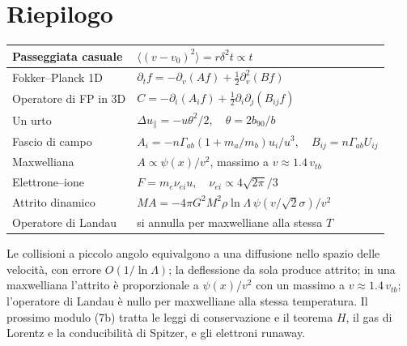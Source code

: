 \section{Riepilogo}
\begin{center}
\small
\begin{tabular}{|l|l|}
\hline
Passeggiata casuale & $\langle(v-v_0)^2\rangle=r\delta^2t\propto t$\\
\hline
Fokker--Planck 1D & $\partial_tf=-\partial_v(Af)+\frac12\partial_v^2(Bf)$\\
\hline
Operatore di FP in 3D & $C=-\partial_i(A_if)+\frac12\partial_i\partial_j(B_{ij}f)$\\
\hline
Un urto & $\Delta u_\parallel=-u\theta^2/2,\quad\theta=2b_{90}/b$\\
\hline
Fascio di campo & $A_i=-n\Gamma_{ab}(1+m_a/m_b)u_i/u^3,\quad B_{ij}=n\Gamma_{ab}U_{ij}$\\
\hline
Maxwelliana & $A\propto\psi(x)/v^2$, massimo a $v\approx1.4\,v_{tb}$\\
\hline
Elettrone--ione & $F=m_e\nu_{ei}u,\quad\nu_{ei}\propto4\sqrt{2\pi}/3$\\
\hline
Attrito dinamico & $MA=-4\pi G^2M^2\rho\ln\Lambda\,\psi(v/\sqrt2\sigma)/v^2$\\
\hline
Operatore di Landau & si annulla per maxwelliane alla stessa $T$\\
\hline
\end{tabular}
\end{center}
Le collisioni a piccolo angolo equivalgono a una diffusione nello spazio delle velocità, con errore $O(1/\ln\Lambda)$; la deflessione da sola produce attrito; in una maxwelliana l'attrito è proporzionale a $\psi(x)/v^2$ con un massimo a $v\approx1.4\,v_{tb}$; l'operatore di Landau è nullo per maxwelliane alla stessa temperatura.
Il prossimo modulo (7b) tratta le leggi di conservazione e il teorema $H$, il gas di Lorentz e la conducibilità di Spitzer, e gli elettroni runaway.
